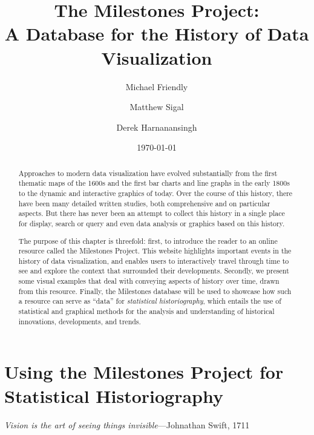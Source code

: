 \documentclass[11pt]{article}
\newcommand*{\epigraph}[2]{{\renewcommand{\baselinestretch}{1}\normalfont\emph{#1}\hfill---#2\par\vspace{1ex}}}
\begin{document}
\title{The Milestones Project: \\ A Database for the History of Data Visualization}
\author{Michael Friendly \and Matthew Sigal \and Derek Harnanansingh}
\date{\today}

\maketitle

\begin{abstract}
Approaches to modern data visualization have evolved substantially from the first thematic maps of the 1600s and the
first bar charts and line graphs
in the early 1800s to the dynamic and interactive graphics of today.
Over the course of this history, there have been many detailed written studies, both comprehensive
and on particular aspects. But there has never been an attempt to collect this history 
in a single place for display, search or query and even data analysis or graphics based on this history.

The purpose of this chapter is threefold: first, to introduce the reader to an online resource called the Milestones Project. 
This website highlights important events in the history of data visualization, and enables users to interactively travel through time to see and explore
the context that surrounded their developments. Secondly, we present some visual
examples that
deal with conveying aspects of history
over time, drawn from this resource.
Finally, the Milestones database  will be used to showcase how such a resource can serve as ``data'' 
for \emph{statistical historiography}, which entails the use of statistical and graphical methods for the analysis and understanding of 
historical innovations, developments, and trends.
\end{abstract}



\section{Using the Milestones Project for Statistical Historiography}\label{sec:historiography}
\epigraph{Vision is the art of seeing things invisible}{Johnathan Swift, 1711}

\end{document}
